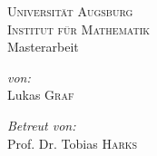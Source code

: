 \documentclass[a4paper,ngerman,11pt,bibliography=totoc]{scrartcl}
\theoremstyle{definition}
\theoremstyle{plain}
\theoremstyle{remark}
\begin{document}
\author{Lukas Graf}
\date{Letzte Aktualisierung: \today}

\thispagestyle{empty}


\begin{titlepage}\center
	\textsc{\LARGE Universität Augsburg}\\[1cm]
	
	\textsc{\Large Institut für Mathematik}\\[1.5cm]
	
	{\Large Masterarbeit \\[1cm]}
	{\huge {}}

	\vfill
	
	\begin{minipage}{0.4\textwidth}
		\begin{flushleft} \large
			\emph{von:}\\
			Lukas \textsc{Graf}
		\end{flushleft}
	\end{minipage}
	\begin{minipage}{0.4\textwidth}
		\begin{flushright} \large
			\emph{Betreut von:} \\
			Prof. Dr. Tobias \textsc{Harks}
		\end{flushright}
	\end{minipage}
	
\end{titlepage}



\tableofcontents






\newpage
\nocite{*}
\printbibliography
\end{document}
